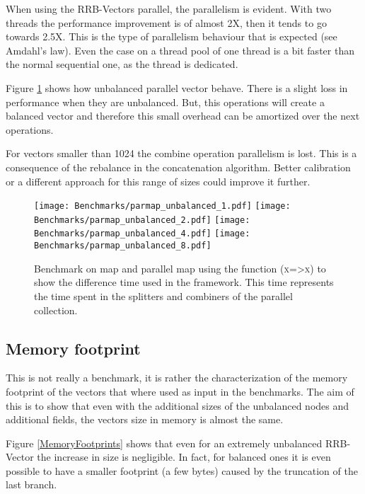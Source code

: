 When using the RRB-Vectors parallel, the parallelism is evident. With two threads the performance improvement is of almost 2X, then it tends to go towards 2.5X. This is the type of parallelism behaviour that is expected (see Amdahl's law\cite{Rodgers:1985:IMS:327010.327215}). Even the case on a thread pool of one thread is a bit faster than the normal sequential one, as the thread is dedicated. 
\FloatBarrier

Figure \ref{ParallelUnbalancedBenchmarks} shows how unbalanced parallel vector behave. There is a slight loss in performance when they are unbalanced. But, this operations will create a balanced vector and therefore this small overhead can be amortized over the next operations.

For vectors smaller than 1024 the combine operation parallelism is lost. This is a consequence of the rebalance in the concatenation algorithm. Better calibration or a different approach for this range of sizes could improve it further.

\begin{figure}[h!]
  \centering
  \texttt{[image: Benchmarks/parmap\_unbalanced\_1.pdf]}
  \texttt{[image: Benchmarks/parmap\_unbalanced\_2.pdf]}
  \texttt{[image: Benchmarks/parmap\_unbalanced\_4.pdf]}
  \texttt{[image: Benchmarks/parmap\_unbalanced\_8.pdf]}
  \caption{Benchmark on map and parallel map using the function (\textsc{x=>x}) to show the difference time used in the framework. This time represents the time spent in the splitters and combiners of the parallel collection.}
  \label{ParallelUnbalancedBenchmarks}
\end{figure}

\FloatBarrier

\subsection{Memory footprint}
This is not really a benchmark, it is rather the characterization of the memory footprint of the vectors that where used as input in the benchmarks. The aim of this is to show that even with the additional sizes of the unbalanced nodes and additional fields, the vectors size in memory is almost the same. 

Figure \ref{MemoryFootprints} shows that even for an extremely unbalanced RRB-Vector the increase in size is negligible. In fact, for balanced ones it is even possible to have a smaller footprint (a few bytes) caused by the truncation of the last branch. 

